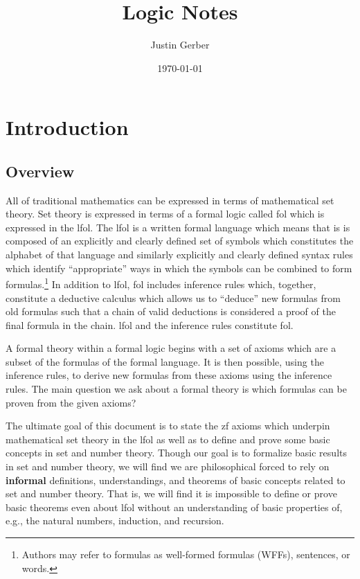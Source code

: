 \documentclass[12pt]{article}
\theoremstyle{break}
\theoremstyle{break}
\theoremstyle{break}
\theoremstyle{break}
\theoremstyle{break}
\newtheorem{informal definition}[definition]{Informal Definition}
\theoremstyle{break}
\newtheorem{informal theorem}[theorem]{Informal Theorem}
\newcommand{\qq}[1]{``#1''}
\begin{document}
	\title{Logic Notes}
	\author{Justin Gerber}
	\date{\today}
	\maketitle
	
	
	\section{Introduction}
	
	
	\subsection{Overview}
	
	All of traditional mathematics can be expressed in terms of mathematical set theory.
	Set theory is expressed in terms of a formal logic called \gls{fol} which is expressed in the \gls{lfol}.
	The \gls{lfol} is a written formal language which means that is is composed of an explicitly and clearly defined set of symbols which constitutes the alphabet of that language and similarly explicitly and clearly defined syntax rules which identify \qq{appropriate} ways in which the symbols can be combined to form formulas.\footnote{Authors may refer to formulas as well-formed formulas (WFFs), sentences, or words.}
	In addition to \gls{lfol}, \gls{fol} includes inference rules which, together, constitute a deductive calculus which allows us to \qq{deduce} new formulas from old formulas such that a chain of valid deductions is considered a proof of the final formula in the chain.
	\gls{lfol} and the inference rules constitute \gls{fol}.
	
	A formal theory within a formal logic begins with a set of axioms which are a subset of the formulas of the formal language.
	It is then possible, using the inference rules, to derive new formulas from these axioms using the inference rules.
	The main question we ask about a formal theory is which formulas can be proven from the given axioms?
	
	The ultimate goal of this document is to state the \gls{zf} axioms which underpin mathematical set theory in the \gls{lfol} as well as to define and prove some basic concepts in set and number theory.
	Though our goal is to formalize basic results in set and number theory, we will find we are philosophical forced to rely on \textbf{informal} definitions, understandings, and theorems of basic concepts related to set and number theory.
	That is, we will find it is impossible to define or prove basic theorems even about \gls{lfol} without an understanding of basic properties of, e.g., the natural numbers, induction, and recursion.
	
\end{document}
